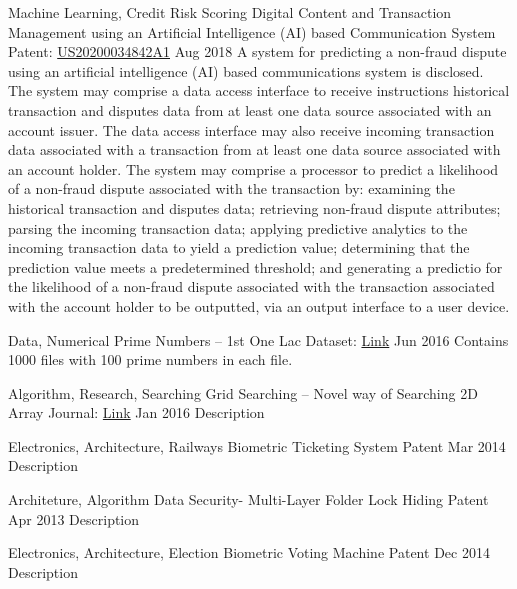 \begin{cventries}
    \vspace{3mm}
    \cventry
    {Machine Learning, Credit Risk Scoring}
    {Digital Content and Transaction Management using an Artificial Intelligence (AI) based Communication System}
    {Patent: \href{https://patents.google.com/patent/US20200034842A1/en}{US20200034842A1}}
    {Aug 2018}
    {A system for predicting a non-fraud dispute using an artificial intelligence (AI) based communications system is disclosed. The system may comprise a data access interface to receive instructions historical transaction and disputes data from at least one data source associated with an account issuer. The data access interface may also receive incoming transaction data associated with a transaction from at least one data source associated with an account holder. The system may comprise a processor to predict a likelihood of a non-fraud dispute associated with the transaction by: examining the historical transaction and disputes data; retrieving non-fraud dispute attributes; parsing the incoming transaction data; applying predictive analytics to the incoming transaction data to yield a prediction value; determining that the prediction value meets a predetermined threshold; and generating a predictio for the likelihood of a non-fraud dispute associated with the transaction associated with the account holder to be outputted, via an output interface to a user device.}

    \cventry
    {Data, Numerical}
    {Prime Numbers – 1st One Lac}
    {Dataset: \href{https://github.com/rehanguha/Generating-Prime-Numbers}{\faLink Link}}
    {Jun 2016}
    {Contains 1000 files with 100 prime numbers in each file.}

    \cventry
    {Algorithm, Research, Searching}
    {Grid Searching – Novel way of Searching 2D Array}
    {Journal: \href{https://www.ijcat.com/show.php?vol=volume5&issu=issue1&uid=ijcatr05011005}{\faLink Link}}
    {Jan 2016}
    {Description}

    \cventry
    {Electronics, Architecture, Railways}
    {Biometric Ticketing System}
    {Patent}
    {Mar 2014}
    {Description}

    \cventry
    {Architeture, Algorithm}
    {Data Security- Multi-Layer Folder Lock Hiding}
    {Patent}
    {Apr 2013}
    {Description}

    \cventry
    {Electronics, Architecture, Election}
    {Biometric Voting Machine}
    {Patent}
    {Dec 2014}
    {Description}

\end{cventries}